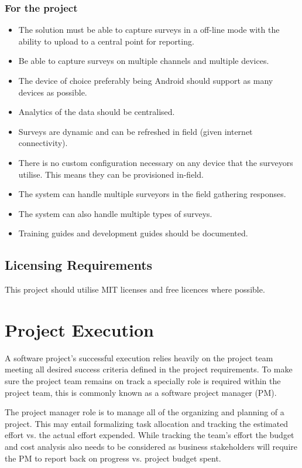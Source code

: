 \documentclass[12pt]{witseiepaper}
\begin{document}
\subsubsection{For the project}
\begin{itemize}
  \item The solution must be able to capture surveys in a off-line mode with the ability to upload to a central point for reporting.
  \item Be able to capture surveys on multiple channels and multiple devices.
  \item The device of choice preferably being Android should support as many devices as possible.
  \item Analytics of the data should be centralised.
  \item Surveys are dynamic and can be refreshed in field (given internet connectivity).
  \item There is no custom configuration necessary on any device that the surveyors utilise. This means they can be provisioned in-field.
  \item The system can handle multiple surveyors in the field gathering responses.
  \item The system can also handle multiple types of surveys.
  \item Training guides and development guides should be documented.
\end{itemize}

\subsection{Licensing Requirements}
This project should utilise MIT licenses and free licences where possible.\\

\section{Project Execution}
A software project's successful execution relies heavily on the project team meeting all desired success criteria defined in the project requirements. To make sure the project team remains on track a specially role is required within the project team, this is commonly known as a software project manager (PM). \cite{SPM}

The project manager role is to manage all of the organizing and planning of a project. This may entail formalizing task allocation and tracking the estimated effort vs. the actual effort expended.
While tracking the team’s effort the budget and cost analysis also needs to be considered as business stakeholders will require the PM to report back on progress vs. project budget spent. \cite{ExpertJudgement}
\end{document}
